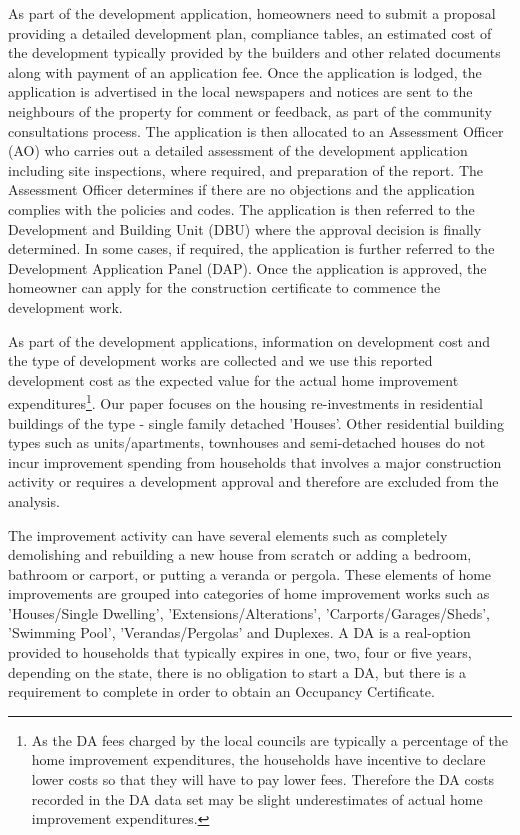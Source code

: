 \documentclass[AEJ,reqno, draftmode]{AEA} %
\begin{document}
As part of the development application, homeowners need to submit a proposal providing a detailed development plan, compliance tables, an estimated cost of the development typically provided by the builders and other related documents along with payment of an application fee. Once the application is lodged, the application is advertised in the local newspapers and notices are sent to the neighbours of the property for comment or feedback, as part of the community consultations process. The application is then allocated to an Assessment Officer (AO) who carries out a detailed assessment of the development application including site inspections, where required, and preparation of the report. The Assessment Officer determines if there are no objections and the application complies with the policies and codes. The application is then referred to the Development and Building Unit (DBU) where the approval decision is finally determined. In some cases, if required, the application is further referred to the Development Application Panel (DAP). Once the application is approved, the homeowner can apply for the construction certificate to commence the development work.

As part of the development applications, information on development cost and the type of development works are collected and we use this reported development cost as the expected value for the actual home improvement expenditures\footnote{As the DA fees charged by the local councils are typically a percentage of the home improvement expenditures, the households have incentive to declare lower costs so that they will have to pay lower fees. Therefore the DA costs recorded in the DA data set may be slight underestimates of actual home improvement expenditures.}. Our paper focuses on the housing re-investments in residential buildings of the type - single family detached 'Houses'. Other residential building types such as units/apartments, townhouses and semi-detached houses do not incur improvement spending from households that involves a major construction activity or requires a development approval and therefore are excluded from the analysis.

The improvement activity can have several elements such as completely demolishing and rebuilding a new house from scratch or adding a bedroom, bathroom or carport, or putting a veranda or pergola. These elements of home improvements are grouped into categories of home improvement works such as 'Houses/Single Dwelling', 'Extensions/Alterations', 'Carports/Garages/Sheds', 'Swimming Pool', 'Verandas/Pergolas' and Duplexes. A DA is a real-option provided to households that typically expires in one, two, four or five years, depending on the state, there is no obligation to start a DA, but there is a requirement to complete in order to obtain an Occupancy Certificate. 
\end{document}
